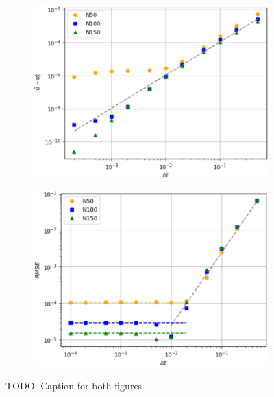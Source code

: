 \documentclass[
  english,        %
  font=times,     %
  onecolumn,      %
]{tumarticle}
\begin{document}
\begin{figure}[!htbp]
    \centering
    \begin{subfigure}[b]{0.49\textwidth}
      \includegraphics[width=\textwidth]{resources/convergence_study_openfoam.png}
      \caption{}
      \label{fig:convergence_openfoam}
    \end{subfigure}
    \hspace{1pt}
    \begin{subfigure}[b]{0.49\textwidth}
      \includegraphics[width=\textwidth]{resources/RMSE_study.png}
      \caption{}
      \label{fig:RMSE_openfoam}
    \end{subfigure}
    \caption{TODO: Caption for both figures}
    \label{fig:figures}
  \end{figure}
  
\end{document}
